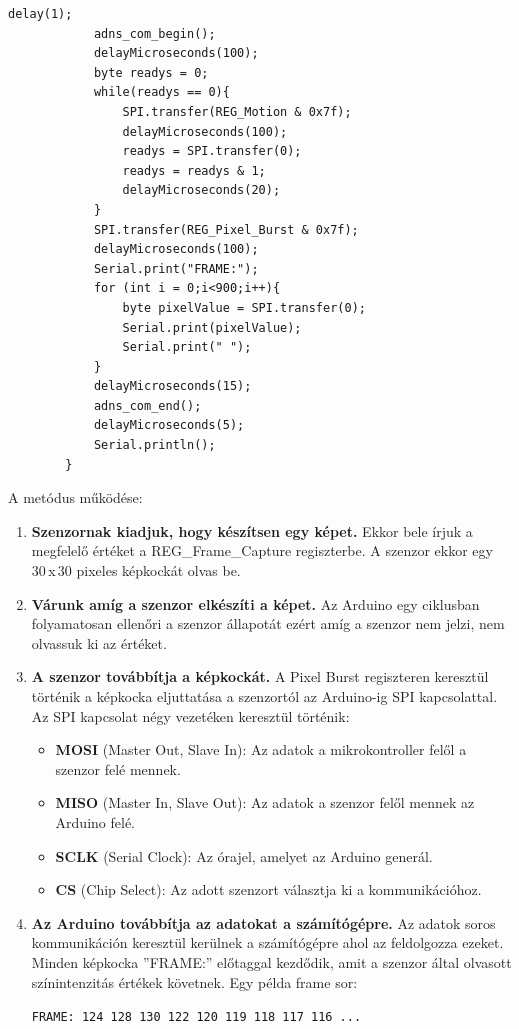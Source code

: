 \documentclass[]{thesis-ekf}
\theoremstyle{definition}
\theoremstyle{remark}
\begin{document}
\begin{enumerate}
\begin{lstlisting}[language=Arduino,label=sendFrame,caption=sendFrame metódus]
			delay(1); 
			adns_com_begin(); 
			delayMicroseconds(100); 
			byte readys = 0;
			while(readys == 0){
				SPI.transfer(REG_Motion & 0x7f);
				delayMicroseconds(100); 
				readys = SPI.transfer(0); 
				readys = readys & 1;
				delayMicroseconds(20);
			}
			SPI.transfer(REG_Pixel_Burst & 0x7f); 
			delayMicroseconds(100); 
			Serial.print("FRAME:");
			for (int i = 0;i<900;i++){
				byte pixelValue = SPI.transfer(0);  
				Serial.print(pixelValue);
				Serial.print(" ");
			}
			delayMicroseconds(15); 
			adns_com_end();  
			delayMicroseconds(5); 
			Serial.println();
		}
	\end{lstlisting}
	\clearpage
	A metódus működése:
	\begin{enumerate}[label=\arabic*.]
		\item \textbf{Szenzornak kiadjuk, hogy készítsen egy képet.} Ekkor bele írjuk a megfelelő értéket a REG\_Frame\_Capture regiszterbe. A szenzor ekkor egy 30\,x\,30 pixeles képkockát olvas be.
		\item \textbf{Várunk amíg a szenzor elkészíti a képet.} Az Arduino egy ciklusban folyamatosan ellenőri a szenzor állapotát ezért amíg a szenzor nem jelzi, nem olvassuk ki az értéket.
		\item \textbf{A szenzor továbbítja a képkockát.} A Pixel Burst regiszteren keresztül történik a képkocka eljuttatása a szenzortól az Arduino-ig SPI kapcsolattal. Az SPI kapcsolat négy vezetéken keresztül történik:
		\begin{itemize}
			\item \textbf{MOSI }(Master Out, Slave In): Az adatok a mikrokontroller felől a szenzor felé mennek.
			\item \textbf{MISO }(Master In, Slave Out): Az adatok a szenzor felől mennek az Arduino felé.
			\item \textbf{SCLK }(Serial Clock): Az órajel, amelyet az Arduino generál.
			\item \textbf{CS }(Chip Select): Az adott szenzort választja ki a kommunikációhoz.
		\end{itemize}
		\item \textbf{Az Arduino továbbítja az adatokat a számítógépre.} Az adatok soros kommunikáción keresztül kerülnek a számítógépre ahol az feldolgozza ezeket. Minden képkocka ''FRAME:'' előtaggal kezdődik, amit a szenzor által olvasott színintenzitás értékek követnek. Egy példa frame sor:
		
		\verb|FRAME: 124 128 130 122 120 119 118 117 116 ...|
	\end{enumerate}
\end{enumerate}
\end{document}
